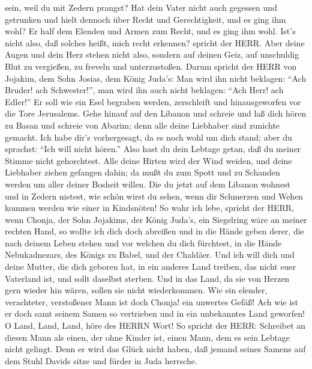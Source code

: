 sein, weil du mit Zedern prangst? Hat dein Vater nicht auch gegessen und
getrunken und hielt dennoch über Recht und Gerechtigkeit, und es ging
ihm wohl?  Er half dem Elenden und Armen zum Recht, und es
ging ihm wohl. Ist's nicht also, daß solches heißt, mich recht erkennen?
spricht der HERR.  Aber deine Augen und dein Herz stehen
nicht also, sondern auf deinen Geiz, auf unschuldig Blut zu vergießen,
zu freveln und unterzustoßen.  Darum spricht der HERR von
Jojakim, dem Sohn Josias, dem König Juda's: Man wird ihn nicht beklagen:
``Ach Bruder! ach Schwester!'', man wird ihn auch nicht beklagen: ``Ach
Herr! ach Edler!''  Er soll wie ein Esel begraben werden,
zerschleift und hinausgeworfen vor die Tore Jerusalems. 
Gehe hinauf auf den Libanon und schreie und laß dich hören zu Basan und
schreie von Abarim; denn alle deine Liebhaber sind zunichte gemacht.
 Ich habe dir's vorhergesagt, da es noch wohl um dich
stand; aber du sprachst: ``Ich will nicht hören.'' Also hast du dein
Lebtage getan, daß du meiner Stimme nicht gehorchtest. 
Alle deine Hirten wird der Wind weiden, und deine Liebhaber ziehen
gefangen dahin; da mußt du zum Spott und zu Schanden werden um aller
deiner Bosheit willen.  Die du jetzt auf dem Libanon
wohnest und in Zedern nistest, wie schön wirst du sehen, wenn dir
Schmerzen und Wehen kommen werden wie einer in Kindsnöten! 
So wahr ich lebe, spricht der HERR, wenn Chonja, der Sohn Jojakims, der
König Juda's, ein Siegelring wäre an meiner rechten Hand, so wollte ich
dich doch abreißen  und in die Hände geben derer, die nach
deinem Leben stehen und vor welchen du dich fürchtest, in die Hände
Nebukadnezars, des Königs zu Babel, und der Chaldäer.  Und
ich will dich und deine Mutter, die dich geboren hat, in ein anderes
Land treiben, das nicht euer Vaterland ist, und sollt daselbst sterben.
 Und in das Land, da sie von Herzen gern wieder hin wären,
sollen sie nicht wiederkommen.  Wie ein elender,
verachteter, verstoßener Mann ist doch Chonja! ein unwertes Gefäß! Ach
wie ist er doch samt seinem Samen so vertrieben und in ein unbekanntes
Land geworfen!  O Land, Land, Land, höre des HERRN Wort!
 So spricht der HERR: Schreibet an diesen Mann als einen,
der ohne Kinder ist, einen Mann, dem es sein Lebtage nicht gelingt. Denn
er wird das Glück nicht haben, daß jemand seines Samens auf dem Stuhl
Davids sitze und fürder in Juda herrsche.


